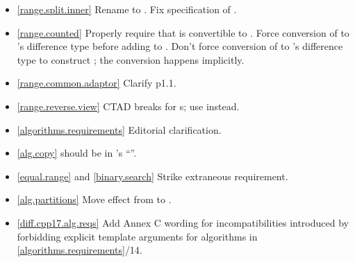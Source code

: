 \begin{itemize}
\item \ref{range.split.inner} Rename  to .
  Fix specification of .
\item \ref{range.counted}
  Properly require that  is convertible to .
  Force conversion of  to 's difference type
  before adding to .
  Don't force conversion of  to 's difference type to
  construct ; the conversion happens implicitly.
\item \ref{range.common.adaptor} Clarify p1.1.
\item \ref{range.reverse.view}  CTAD breaks for
  s; use  instead.
\item \ref{algorithms.requirements} Editorial clarification.
\item \ref{alg.copy}  should be  in
  's ``\returns''.
\item \ref{equal.range} and \ref{binary.search} Strike extraneous requirement.
\item \ref{alg.partitions} Move effect from \returns to \effects.
\item \ref{diff.cpp17.alg.reqs} Add Annex C wording for incompatibilities
  introduced by forbidding explicit template arguments for algorithms in
  \ref{algorithms.requirements}/14.
\end{itemize}


